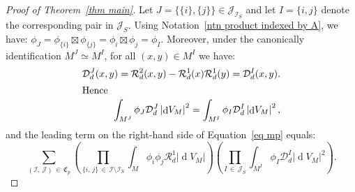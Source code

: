\documentclass[10pt]{amsart}
\theoremstyle{definition}\newtheorem{defi}[theo]{Definition}\newtheorem{rema}[theo]{Remark}\newtheorem{exam}[theo]{Example}\newtheorem{exem}[theo]{Example}\newtheorem{nota}[theo]{Notation}
\DeclareMathOperator{\dmesure}{d}
\newcommand{\D}{\mathcal{D}}
\newcommand{\I}{\mathcal{I}}
\newcommand{\J}{\mathcal{J}}
\newcommand{\clR}{\mathcal{R}}
\newcommand{\frkC}{\mathfrak{C}}
\newcommand{\norm}[1]{\left\lvert #1 \right\rvert}
\newcommand{\rmes}[1]{\norm{\dmesure\! V_{#1}}}
\begin{document}
\begin{proof}[{Proof of Theorem~\ref{thm main}}]
Let $J =\{\{i\},\{j\}\} \in \J_{\I_S}$ and let $I = \{i,j\}$ denote the corresponding pair in $\J_S$. Using Notation~\ref{ntn product indexed by A}, we have: $\phi_J = \phi_{\{i\}} \boxtimes \phi_{\{j\}} = \phi_i \boxtimes \phi_j = \phi_I$. Moreover, under the canonically identification $M^J \simeq M^I$, for all $(x,y) \in M^I$ we have:
\begin{align*}
\D_d^J(x,y) = \clR^2_d(x,y) - \clR^1_d(x)\clR^1_d(y) = \D_d^I(x,y).
\\
\intertext{Hence}
\int_{M^J} \phi_J \D_d^J \rmes{M}^2 = \int_{M^I} \phi_I \D_d^I \rmes{M}^2,
\end{align*}
and the leading term on the right-hand side of Equation~\eqref{eq mp} equals:
\begin{equation}\label{eq mp leading term}
\sum_{(\I,\,\J)\,\in\,\frkC_p} \left(\prod_{\{i,\,j\}\,\in\,\I \setminus \I_S} \int_M \phi_i\phi_j\clR^1_d \rmes{M}\right)\left(\prod_{I\,\in\,\J_S} \int_{M^I} \phi_I \D_d^I \rmes{M}^2 \right).
\end{equation}


\end{proof}
\end{document}
